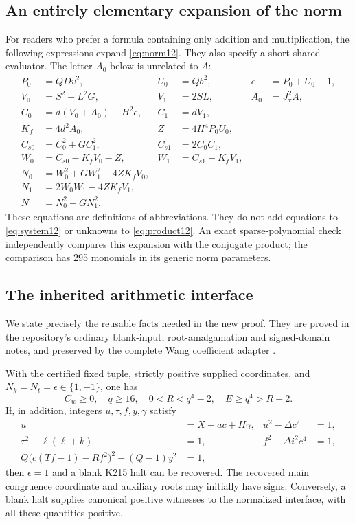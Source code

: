 \subsection{An entirely elementary expansion of the norm}
For readers who prefer a formula containing only addition and multiplication,
the following expressions expand \eqref{eq:norm12}. They also specify a
short shared evaluator. The letter $A_0$ below is unrelated to $A$:
\begin{align*}
 P_0&=QDv^2,&U_0&=Qb^2,&e&=P_0+U_0-1,\\
 V_0&=S^2+L^2G,&V_1&=2SL,&A_0&=J_\tau^2A,\\
 C_0&=d(V_0+A_0)-H^2e,&C_1&=dV_1,\\
 K_f&=4d^2A_0,&Z&=4H^4P_0U_0,\\
 C_{s0}&=C_0^2+GC_1^2,&C_{s1}&=2C_0C_1,\\
 W_0&=C_{s0}-K_fV_0-Z,&W_1&=C_{s1}-K_fV_1,\\
 N_0&=W_0^2+GW_1^2-4ZK_fV_0,\\
 N_1&=2W_0W_1-4ZK_fV_1,\\
 N&=N_0^2-GN_1^2.
\end{align*}
These equations are definitions of abbreviations. They do not add
equations to \eqref{eq:system12} or unknowns to \eqref{eq:product12}.
An exact sparse-polynomial check independently compares this expansion with
the conjugate product; the comparison has 295 monomials in its generic
norm parameters.

\subsection{The inherited arithmetic interface}
We state precisely the reusable facts needed in the new proof. They are
proved in the repository's ordinary blank-input, root-amalgamation and
signed-domain notes, and preserved by the complete Wang coefficient adapter
\cite{p19,p21,arithmetic}.

\begin{proposition}
\label{prop:interface}
With the certified fixed tuple, strictly positive supplied coordinates,
and $N_k=N_t=\epsilon\in\{1,-1\}$, one has
\[
 C_w\ge0,\quad q\ge16,\quad 0<R<q^4-2,\quad E\ge q^4>R+2.
\]
If, in addition, integers $u,\tau,f,y,\gamma$ satisfy
\begin{align*}
 u&=X+ac+H\gamma,& u^2-\Delta c^2&=1,\\
 \tau^2-\ell(\ell+k)&=1,& f^2-\Delta i^2c^4&=1,\\
 Q\bigl(c(Tf-1)-Rf^2\bigr)^2-(Q-1)y^2&=1,
 \end{align*}
then $\epsilon=1$ and a blank K215 halt can be recovered. The recovered
main congruence coordinate and auxiliary roots may initially have signs.
Conversely, a blank halt supplies canonical positive witnesses to the
normalized interface, with all these quantities positive.
\end{proposition}

